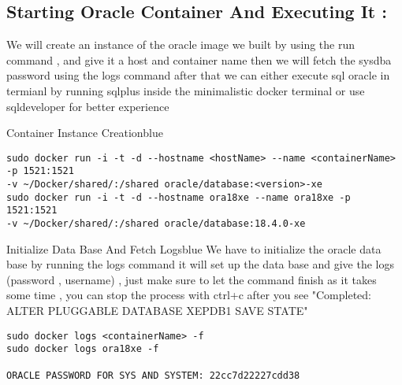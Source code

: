 \documentclass{article}
\begin{document}
\vspace{0.25cm}
\subsection{Starting Oracle Container And Executing It :}
We will create an instance of the oracle image we built by using the run command , and give it a host and container name
then we will fetch the sysdba password using the logs command after that we can either execute sql oracle in termianl
by running sqlplus inside the minimalistic docker terminal or use sqldeveloper for better experience 

\vspace{0.25cm}
\begin{prettyBox}{Container Instance Creation}{blue}

\begin{verbatim}
sudo docker run -i -t -d --hostname <hostName> --name <containerName> -p 1521:1521
-v ~/Docker/shared/:/shared oracle/database:<version>-xe
sudo docker run -i -t -d --hostname ora18xe --name ora18xe -p 1521:1521
-v ~/Docker/shared/:/shared oracle/database:18.4.0-xe
\end{verbatim}

\end{prettyBox}

\vspace{0.5cm}
\begin{prettyBox}{Initialize Data Base And Fetch Logs}{blue}
We have to initialize the oracle data base by running the logs command it will
set up the data base and give the logs (password , username) , just make sure
to let the command finish as it takes some time , you can stop the process
with ctrl+c after you see "Completed: ALTER PLUGGABLE DATABASE XEPDB1 SAVE STATE"
\begin{verbatim}
sudo docker logs <containerName> -f
sudo docker logs ora18xe -f

ORACLE PASSWORD FOR SYS AND SYSTEM: 22cc7d22227cdd38

\end{verbatim}
\end{prettyBox}
\end{document}
